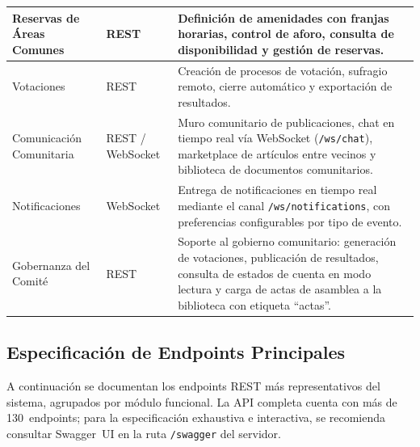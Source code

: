 \begin{longtable}{|p{}|p{}|p{}|}
Reservas de Áreas Comunes &
REST &
Definición de amenidades con franjas horarias, control de aforo, consulta de disponibilidad y gestión de reservas. \\
\hline

Votaciones &
REST &
Creación de procesos de votación, sufragio remoto, cierre automático y exportación de resultados. \\
\hline

Comunicación Comunitaria &
REST / WebSocket &
Muro comunitario de publicaciones, chat en tiempo real vía WebSocket (\texttt{/ws/chat}), marketplace de artículos entre vecinos y biblioteca de documentos comunitarios. \\
\hline

Notificaciones &
WebSocket &
Entrega de notificaciones en tiempo real mediante el canal \texttt{/ws/notifications}, con preferencias configurables por tipo de evento. \\
\hline

Gobernanza del Comité &
REST &
Soporte al gobierno comunitario: generación de votaciones, publicación de resultados, consulta de estados de cuenta en modo lectura y carga de actas de asamblea a la biblioteca con etiqueta ``actas''. \\

\end{longtable}

\subsection{Especificación de Endpoints Principales}

A continuación se documentan los endpoints REST más representativos del sistema, agrupados por módulo funcional. La API completa cuenta con más de 130~endpoints; para la especificación exhaustiva e interactiva, se recomienda consultar Swagger~UI en la ruta \texttt{/swagger} del servidor.

